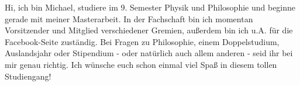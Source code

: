 \begin{multicols*}{2}
{Hi, ich bin Michael, studiere im 9. Semester Physik und Philosophie und beginne gerade mit meiner Masterarbeit. In der Fachschaft bin ich momentan Vorsitzender und Mitglied verschiedener Gremien, außerdem bin ich u.A. für die Facebook-Seite zuständig. Bei Fragen zu Philosophie, einem Doppelstudium, Auslandsjahr oder Stipendium - oder natürlich auch allem anderen - seid ihr bei mir genau richtig. Ich wünsche euch schon einmal viel Spaß in diesem tollen Studiengang!}


\end{multicols*}
